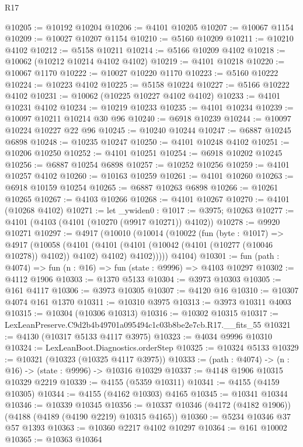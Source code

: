 \begin{lexlean}{R17}
\begin{coremodule}
@10205 := @10192 @10204
@10206 := @4101 @10205
@10207 := @10067 @1154
@10209 := @10027 @10207 @1154
@10210 := @5160 @10209
@10211 := @10210 @4102
@10212 := @5158 @10211
@10214 := @5166 @10209 @4102
@10218 := @10062 (@10212 @10214 @4102 @4102)
@10219 := @4101 @10218
@10220 := @10067 @1170
@10222 := @10027 @10220 @1170
@10223 := @5160 @10222
@10224 := @10223 @4102
@10225 := @5158 @10224
@10227 := @5166 @10222 @4102
@10231 := @10062 (@10225 @10227 @4102 @4102)
@10233 := @4101 @10231 @4102
@10234 := @10219 @10233
@10235 := @4101 @10234
@10239 := @10097 @10211 @10214 @30 @96
@10240 := @6918 @10239
@10244 := @10097 @10224 @10227 @22 @96
@10245 := @10240 @10244
@10247 := @6887 @10245 @6898
@10248 := @10235 @10247
@10250 := @4101 @10248 @4102
@10251 := @10206 @10250
@10252 := @4101 @10251
@10254 := @6918 @10202 @10245
@10256 := @6887 @10254 @6898
@10257 := @10252 @10256
@10259 := @4101 @10257 @4102
@10260 := @10163 @10259
@10261 := @4101 @10260
@10263 := @6918 @10159 @10254
@10265 := @6887 @10263 @6898
@10266 := @10261 @10265
@10267 := @4103 @10266
@10268 := @4101 @10267
@10270 := @4101 (@10268 @4102)
@10271 := let _ywiden0 : @1017 := @3975; @10263
@10277 := @4101 (@4103 (@4101 (@10270 (@9917 @10271)) @4102))
@10278 := @9920 @10271
@10297 := @4917
    (@10010
      (@10014
        (@10022
          (fun (byte : @1017) =>
          @4917
            (@10058
              (@4101
                (@4101 (@4101 (@10042 (@4101 (@10277 (@10046 @10278)) @4102)) @4102) @4102)
                @4102)))))
      @4104)
@10301 := fun (path : @4074) => fun (n : @16) => fun (state : @9996) => @4103 @10297
@10302 := @4112 @1906
@10303 := @1370 @5133
@10304 := @3973 @10303
@10305 := @161 @4117
@10306 := @3973 @10305
@10307 := @4120 @16
@10310 := @10307 @4074 @161 @1370
@10311 := @10310 @3975
@10313 := @3973 @10311 @4003
@10315 := @10304 (@10306 @10313)
@10316 := @10302 @10315
@10317 := LexLeanPreserve.C9d2b4b49701a095494c1c03b8be2e7cb.R17.__fits_55
@10321 := @4130 (@10317 @5133 @4117 @3975)
@10323 := @4034 @9996 @10310
@10324 := LexLeanBoot.Diagnostics.orderStep
@10325 := @10324 @5133
@10329 := @10321 (@10323 (@10325 @4117 @3975))
@10333 := (path : @4074) -> (n : @16) -> (state : @9996) -> @10316 @10329
@10337 := @4148 @1906 @10315 @10329 @2219
@10339 := @4155 (@5359 @10311)
@10341 := @4155 (@4159 @10305)
@10344 := @4155 (@4162 @10303) @4165
@10345 := @10341 @10344
@10346 := @10339 @10345
@10356 := @10337 @10346 (@4172 (@4182 @1906)) (@4188 (@4189 (@4190 @2219) @10315 @4165))
@10360 := @5234 @10346 @37 @57 @1393
@10363 := @10360 @2217 @4102 @10297
@10364 := @161 @10002
@10365 := @10363 @10364

\end{coremodule}
\end{lexlean}
